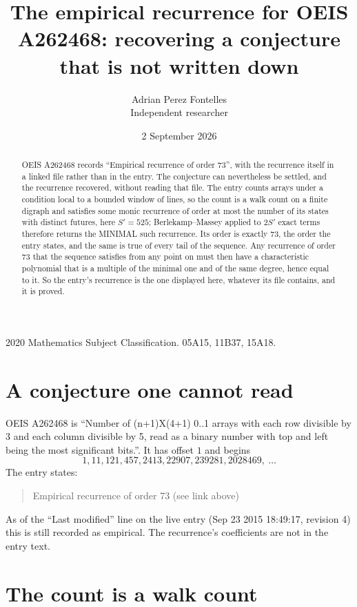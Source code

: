 \documentclass[11pt,a4paper]{article}
\title{The empirical recurrence for OEIS A262468: recovering a conjecture that is not written down}
\author{Adrian Perez Fontelles\\ \small Independent researcher}
\date{2 September 2026}
\theoremstyle{plain}
\theoremstyle{definition}
\begin{document}
\maketitle

\begin{abstract}
OEIS A262468 records ``Empirical recurrence of order $73$'', with the recurrence itself in a
linked file rather than in the entry. The conjecture can nevertheless be settled, and the
recurrence recovered, without reading that file. The entry counts arrays under a condition
local to a bounded window of lines, so the count is a walk count on a finite digraph and
satisfies some monic recurrence of order at most the number of its states with distinct
futures, here $S'=525$; Berlekamp--Massey applied to $2S'$ exact
terms therefore returns the MINIMAL such recurrence. Its order is exactly $73$, the order
the entry states, and the same is true of every tail of the sequence. Any recurrence of order
$73$ that the sequence satisfies from any point on must then have a characteristic
polynomial that is a multiple of the minimal one and of the same degree, hence equal to it. So
the entry's recurrence is the one displayed here, whatever its file contains, and it is
proved.
\end{abstract}

\noindent\small 2020 Mathematics Subject Classification. 05A15, 11B37, 15A18.\normalsize

\section{A conjecture one cannot read}

OEIS A262468 is ``Number of (n+1)X(4+1) 0..1 arrays with each row divisible by 3 and each column divisible by 5, read as a binary number with top and left being the most significant bits.''. It has offset $1$ and begins
\[
1, 11, 121, 457, 2413, 22907, 239281, 2028469,\ \dots
\]
The entry states:
\begin{quote}
Empirical recurrence of order 73 (see link above)
\end{quote}
As of the ``Last modified'' line on the live entry (Sep 23 2015 18:49:17, revision 4) this is still
recorded as empirical. The recurrence's coefficients are not in the entry text.

\section{The count is a walk count}
\end{document}
